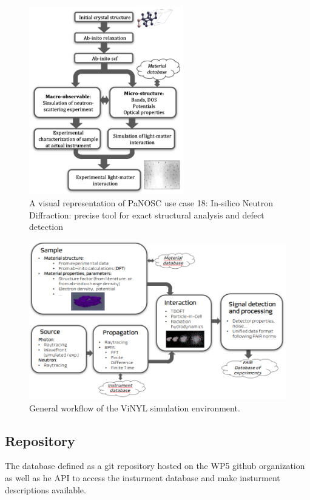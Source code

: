 \documentclass[11pt, a4paper]{article}
\begin{document}
\begin{figure}
    \centering
    \includegraphics[width=0.6\textwidth]{figures/usecase_mono.png}
    \caption{A visual representation of PaNOSC use case 18: In-silico Neutron Diffraction: precise tool for exact structural analysis and defect detection}
    \label{fig:my_label}
\end{figure}

\begin{figure}
    \centering
    \includegraphics[width=\textwidth]{figures/panosc_diag2.png}
    \caption{General workflow of the ViNYL simulation environment.}
    \label{fig:my_label}
\end{figure}


\subsection{Repository}
The database defined as a git repository hosted on the WP5 github organization as well as
he API to access the insturment database and make insturment descriptions available.
\end{document}
